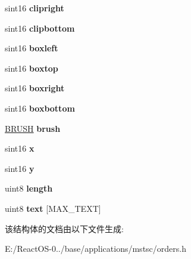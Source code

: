 \begin{DoxyCompactItemize}
sint16 {\bfseries clipright}
\item 
\mbox{\label{struct___t_e_x_t2___o_r_d_e_r_aa9eebcd4af061829db92428976b14e57}} 
sint16 {\bfseries clipbottom}
\item 
\mbox{\label{struct___t_e_x_t2___o_r_d_e_r_a4c0747dbcba8f919ffdaef638e909a6f}} 
sint16 {\bfseries boxleft}
\item 
\mbox{\label{struct___t_e_x_t2___o_r_d_e_r_ab5cae243e54faed27e33b865a0282531}} 
sint16 {\bfseries boxtop}
\item 
\mbox{\label{struct___t_e_x_t2___o_r_d_e_r_ace1793ca3e795f1612f1bb0a8c4aaeb4}} 
sint16 {\bfseries boxright}
\item 
\mbox{\label{struct___t_e_x_t2___o_r_d_e_r_a0c7ffde67ed3b20eb1f0f6c7343e7de9}} 
sint16 {\bfseries boxbottom}
\item 
\mbox{\label{struct___t_e_x_t2___o_r_d_e_r_af45fa63cca541b87e13cd367a8185f1a}} 
\hyperlink{class_b_r_u_s_h}{B\+R\+U\+SH} {\bfseries brush}
\item 
\mbox{\label{struct___t_e_x_t2___o_r_d_e_r_aa6015044a95f8ea484b808d65036dfa4}} 
sint16 {\bfseries x}
\item 
\mbox{\label{struct___t_e_x_t2___o_r_d_e_r_a7ede9c75ce27e3f7f221e5f3f72c6629}} 
sint16 {\bfseries y}
\item 
\mbox{\label{struct___t_e_x_t2___o_r_d_e_r_abdbe9664188dd7e519d3f147a8468a8c}} 
uint8 {\bfseries length}
\item 
\mbox{\label{struct___t_e_x_t2___o_r_d_e_r_a010bf7d1659efcc1602397c81f314476}} 
uint8 {\bfseries text} \mbox{[}M\+A\+X\+\_\+\+T\+E\+XT\mbox{]}
\end{DoxyCompactItemize}


该结构体的文档由以下文件生成\+:\begin{DoxyCompactItemize}
\item 
E\+:/\+React\+O\+S-\/0../base/applications/mstsc/orders.\+h\end{DoxyCompactItemize}
